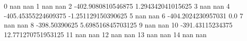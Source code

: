 0 nan nan
1 nan nan
2 -402.9080810546875 1.294342041015625
3 nan nan
4 -405.45355224609375 -1.251129150390625
5 nan nan
6 -404.2024230957031 0.0
7 nan nan
8 -398.50390625 5.698516845703125
9 nan nan
10 -391.43115234375 12.771270751953125
11 nan nan
12 nan nan
13 nan nan
14 nan nan
